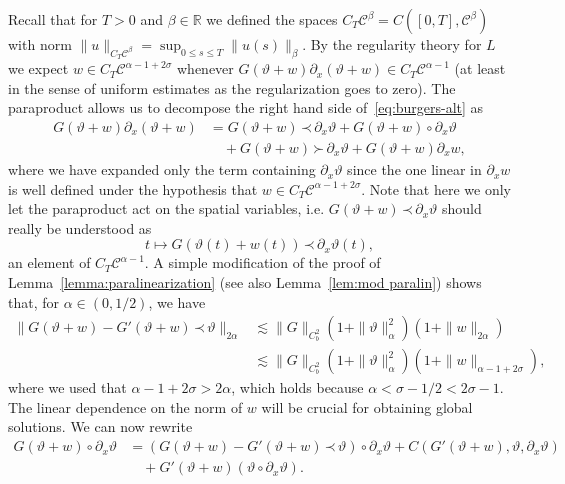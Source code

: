 \documentclass[a4paper,11pt]{article}
\theoremstyle{remark}
\newcommand{\CC}{\ensuremath{\mathscr{C}}}
\newcommand{\lpara}{\,\mathord{\prec}\,}
\newcommand{\rpara}{\,\mathord{\succ}\,}
\newcommand{\reso}{\,\mathord{\circ}\,}
\begin{document}
Recall that for $T>0$
and $\beta \in \mathbb{R}$ we defined the spaces $C_{T} \CC^{\beta} =C( [ 0,T ], \CC^{\beta})$ with norm $\| u \|_{C_{T} \CC^{\beta}} = \sup_{0 \leqslant s \leqslant T} \| u ( s ) \|_{\beta}$. By the regularity theory for $L$ we expect $w \in C_{T} \CC^{\alpha -1+2 \sigma}$ whenever $G ( \vartheta +w ) \partial_{x} ( \vartheta +w ) \in C_{T}\CC^{\alpha -1}$ (at least in the sense of uniform estimates as the
regularization goes to zero). The paraproduct allows us to decompose the right
hand side of~{\eqref{eq:burgers-alt}} as
\begin{align*}
   G ( \vartheta +w ) \partial_{x} ( \vartheta +w ) & =G ( \vartheta +w ) \lpara \partial_{x} \vartheta +G ( \vartheta +w ) \reso \partial_{x} \vartheta \\
   &\quad +G( \vartheta +w ) \rpara \partial_{x} \vartheta +G ( \vartheta +w ) \partial_{x} w,
\end{align*}
where we have expanded only the term containing $\partial_{x} \vartheta$ since
the one linear in $\partial_{x} w$ is well defined under the hypothesis that
$w \in C_{T} \CC^{\alpha -1+2 \sigma}$. Note that here we only let the
paraproduct act on the spatial variables, i.e. $G ( \vartheta +w ) \lpara \partial_{x} \vartheta$ should really be understood as
\[
   t \mapsto G (\vartheta ( t ) +w ( t ) ) \lpara \partial_{x} \vartheta ( t ),
\]
an element of $C_{T} \CC^{\alpha -1}$. A simple modification of the proof of
Lemma~\ref{lemma:paralinearization} (see also Lemma~\ref{lem:mod paralin}) shows that, for $\alpha \in (0,1/2)$, we have
\begin{align*}
   \| G ( \vartheta +w ) -G' ( \vartheta +w ) \lpara \vartheta \|_{2 \alpha} & \lesssim \| G \|_{C^{2}_{b}} ( 1+ \| \vartheta \|^{2}_{\alpha})(1 + \| w \|_{2 \alpha} ) \\
   & \lesssim \| G \|_{C^{2}_{b}} ( 1+ \| \vartheta \|^{2}_{\alpha})(1 +  \| w \|_{\alpha -1+2 \sigma} ) ,
\end{align*}
where we used that $\alpha -1+2 \sigma >2 \alpha$, which holds because $\alpha < \sigma -1/2<2 \sigma -1$. The linear dependence on the norm of $w$ will be
crucial for obtaining global solutions. We can now rewrite
\begin{align*}
   G ( \vartheta +w ) \reso \partial_{x} \vartheta & = ( G ( \vartheta +w ) -G'( \vartheta +w ) \lpara \vartheta ) \reso \partial_{x} \vartheta +C ( G' ( \vartheta +w ) , \vartheta , \partial_{x} \vartheta ) \\
   &\quad + G' ( \vartheta +w )( \vartheta \reso \partial_{x} \vartheta ).
\end{align*}
\end{document}
